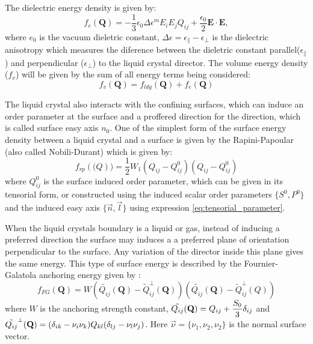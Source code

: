 \documentclass[final,5p,times,twocolumn]{elsarticle}
\begin{document}
The dielectric energy density is given by:
\begin{equation}
 f_e(\mathbf{Q})= -\dfrac{1}{3} \epsilon_0 \Delta \epsilon^m E_i E_j Q_{ij}+ \dfrac{\epsilon_0}{2}  \mathbf{E} \cdot \mathbf{E},
\end{equation}
where $e_0$ is the vacuum dieletric constant,
$\Delta \epsilon=\epsilon_{\parallel} - \epsilon_{\perp}$ is the
dielectric anisotropy which measures the diference between the
dieletric constant parallel($\epsilon_{\parallel}$) and perpendicular
($\epsilon_{\perp}$) to the liquid crystal director.  The volume energy
density ($f_v$) will be given by the sum of all energy terms being considered:
\begin{equation}\label{eq:total_energy}
  f_v(\mathbf{Q})=f_{ldg}(\mathbf{Q})+f_e(\mathbf{Q})
\end{equation}

The liquid crystal also interacts with the confining surfaces, which
can induce an order parameter at the surface and a proffered direction
for the direction, which is called surface easy axis $n_0$. One of the
simplest form of the surface energy density between a liquid crystal
and a surface is given by the Rapini-Papoular (also called Nobili-Durant) which is given by:
\begin{equation}
  f_{rp}(\mathbf(Q))=\dfrac{1}{2} W_1 (Q_{ij}-Q^0_{ij}) (Q_{ij}-Q^0_{ij})
\end{equation}
where $Q_{ij}^0$ is the surface induced order parameter, which can be
given in its tensorial form, or constructed using the induced scalar
order parameters $\lbrace S^0, P^0 \rbrace$ and the induced easy axis
$\lbrace \vec{n}, \vec{l} \rbrace$ using expression
\ref{eq:tensorial_parameter}.

When the liquid crystals boundary is a liquid or gas, instead of
inducing a preferred direction the surface may induces a a preferred
plane of orientation perpendicular to the surface. Any variation of
the director inside this plane gives the same energy. This type of
surface energy is described by the Fournier-Galatola anchoring energy
given by \cite{Sec2012}:
\begin{equation} \label{eq:penalizacao}
f_{FG}(\mathbf{Q})=W\left( \tilde{Q_{ij}}(\mathbf{Q}) - \tilde{Q}_{ij}^{\perp}(\mathbf{Q}) \right)\left( \tilde{Q_{ij}}(\mathbf{Q}) - \tilde{Q}_{ij}^{\perp}(\mathbf{}{Q}) \right)
\end{equation}
where $W$ is the anchoring strength constant,
$\tilde{Q_{ij}}(\bold{Q})=Q_{ij}+\dfrac{S_0}{3} \delta_{ij}$ and
$\tilde{Q_{ij}}^{\perp}(\bold{Q})=(\delta_{ik}-\nu_i \nu_k)Q_{kl}
(\delta_{lj}-\nu_l \nu_j)$. Here $\vec{\nu}=\lbrace\nu_1,\nu_2,\nu_2 \rbrace$ is the normal surface vector.
\end{document}
